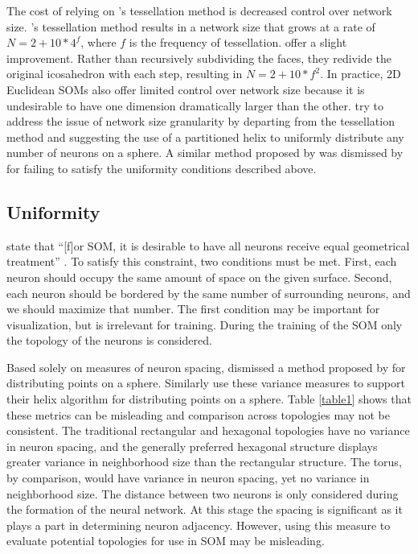\documentclass[10pt,titlepage]{article}
\begin{document}
The cost of relying on \citeauthor{ritter99}'s tessellation method is decreased
control over network size. \citeauthor{ritter99}'s tessellation method results
in a network size that grows at a rate of \(N=2+10*4^f\), where $f$ is the
frequency of tessellation. \cite{wu2006} offer a slight improvement. Rather than
recursively subdividing the faces, they redivide the original icosahedron with
each step, resulting in \(N=2+10*f^2\).  In practice, 2D Euclidean SOMs also offer
limited control over network size because it is undesirable to have one dimension
dramatically larger than the other. \cite{Nishio:2006fk} try to address the
issue of network size granularity by departing from the tessellation method and
suggesting the use of a partitioned helix to uniformly distribute any number of
neurons on a sphere.  A similar method proposed by \cite{Rakhmanov94} was
dismissed by \cite{wu2005} for failing to satisfy the uniformity conditions
described above.

\subsection{Uniformity}
\citeauthor{wu2006} state that ``[f]or SOM, it is desirable to have all neurons
receive equal geometrical treatment'' \cite[p. 900]{wu2006}.  To satisfy this
constraint, two conditions must be met.  First, each neuron should occupy the
same amount of space on the given surface.  Second, each neuron should be
bordered by the same number of surrounding neurons, and we should maximize that
number.  The first condition may be important for visualization, but is
irrelevant for training.  During the training of the SOM only the topology of
the neurons is considered.

Based solely on measures of neuron spacing, \cite{wu2005} dismissed a method
proposed by \cite{Rakhmanov94} for distributing points on a sphere.  Similarly
\cite{Nishio:2006fk} use these variance measures to support their helix
algorithm for distributing points on a sphere.  Table \ref{table1} shows that
these metrics can be misleading and comparison across topologies may not be
consistent.
The traditional rectangular and hexagonal topologies have no variance in neuron
spacing, and the generally preferred hexagonal structure displays greater
variance in neighborhood size than the rectangular structure.  The torus, by
comparison, would have variance in neuron spacing, yet no variance in
neighborhood size.  The distance between two neurons is only considered during
the formation of the neural network.  At this stage the spacing is significant
as it plays a part in determining neuron adjacency. However, using this measure
to evaluate potential topologies for use in SOM may be misleading.
\end{document}
